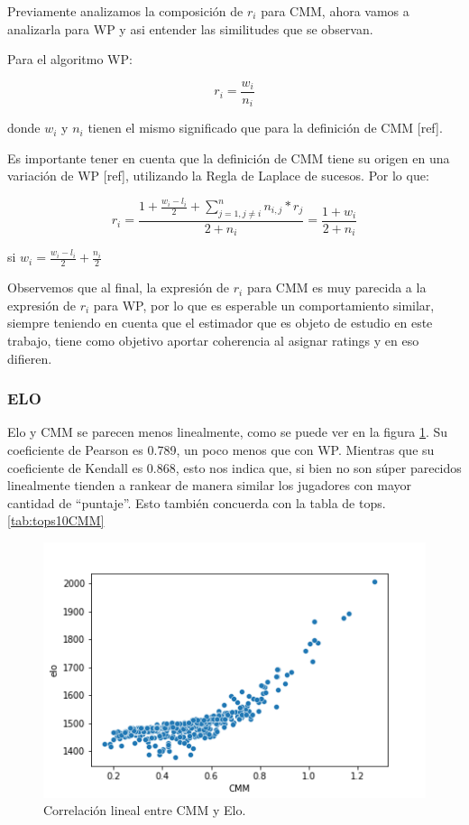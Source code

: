 Previamente analizamos la composición de $r_i$ para CMM, ahora vamos a analizarla para WP y asi entender las similitudes que se observan.

Para el algoritmo WP:

\begin{equation}
    r_i = \frac{w_i}{n_i}   
\end{equation}

donde $w_i$ y $n_i$ tienen el mismo significado que para la definición de CMM [ref].

Es importante tener en cuenta que la definición de CMM tiene su origen en una variación de WP [ref], utilizando la Regla de Laplace de sucesos. Por lo que:

\begin{equation}
    r_i = \frac{1 + \frac{w_i - l_i}{2} + \sum_{j=1, j \neq i}^{n}{n_{i,j} * r_j}}{2 + n_i} = \frac{1 + w_i}{2 + n_i}
\end{equation}

si $w_i = \frac{w_i - l_i}{2} + \frac{n_i}{2}$

Observemos que al final, la expresión de $r_i$ para CMM es muy parecida a la expresión de $r_i$ para WP, por lo que es esperable un comportamiento similar, siempre teniendo en cuenta que el estimador que es objeto de estudio en este trabajo, tiene como objetivo aportar coherencia al asignar ratings y en eso difieren.

\FloatBarrier
\subsubsection{ELO}

Elo y CMM se parecen menos linealmente, como se puede ver en la figura \ref{fig:sc_cmm_elo}. Su coeficiente de Pearson es 0.789, un poco menos que con WP. Mientras que su coeficiente de Kendall es 0.868, esto nos indica que, si bien no son súper parecidos linealmente tienden a rankear de manera similar los jugadores con mayor cantidad de ``puntaje''. Esto también concuerda con la tabla de tops.\ref{tab:tops10CMM}

\begin{figure}[h]
 \centering
 \includegraphics[scale=0.8]{imagenes/scatterplot_CMM_Elo.png}
 \caption{Correlación lineal entre CMM y Elo.}
 \label{fig:sc_cmm_elo}
\end{figure}

